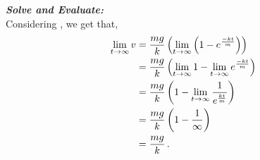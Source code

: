 \begin{subquestions}
\begin{subsubquestions}
\textbf{\textit{Solve and Evaluate:}} \\ 
Considering , we get that,
\begin{align}
		\lim_{t\rightarrow \infty} v & = \frac{mg}{k} \left(\lim_{t\rightarrow \infty}      \left(1-e^{\frac{-kt}{m}}\right)\right) \nonumber \\
		 & = \frac{mg}{k} \left(\lim_{t\rightarrow \infty}1-\lim_{t\rightarrow \infty}e^{\frac{-kt}{m}}\right) \nonumber \\
	 	 & = \frac{mg}{k} \left(1-\lim_{t\rightarrow \infty}\frac{1}{e^{\frac{kt}{m}}}\right) \nonumber \\ 
		 & = \frac{mg}{k} \left(1-\frac{1}{\infty}\right) \nonumber \\ 
		 & = \frac{mg}{k} \,.
\end{align}\\

\end{subsubquestions}
	
\end{subquestions}





















